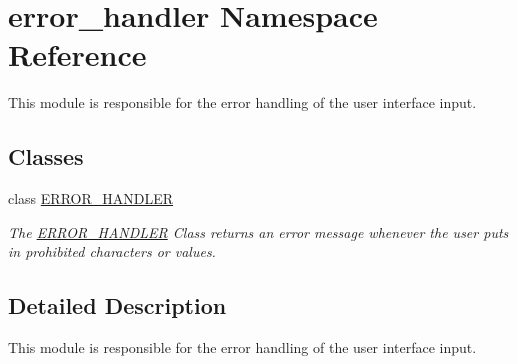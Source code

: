 \hypertarget{namespaceerror__handler}{}\section{error\+\_\+handler Namespace Reference}
\label{namespaceerror__handler}


This module is responsible for the error handling of the user interface input.  


\subsection*{Classes}
\begin{DoxyCompactItemize}
\item 
class \hyperlink{classerror__handler_1_1ERROR__HANDLER}{E\+R\+R\+O\+R\+\_\+\+H\+A\+N\+D\+L\+ER}
\begin{DoxyCompactList}\small\item\em The \hyperlink{classerror__handler_1_1ERROR__HANDLER}{E\+R\+R\+O\+R\+\_\+\+H\+A\+N\+D\+L\+ER} Class returns an error message whenever the user puts in prohibited characters or values. \end{DoxyCompactList}\end{DoxyCompactItemize}


\subsection{Detailed Description}
This module is responsible for the error handling of the user interface input. 


